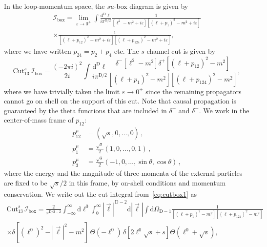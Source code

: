 \documentclass[12pt]{article}
\numberwithin{figure}{section}
\def \be {\begin{equation}}
\def \ee {\end{equation}}
\def \D {\mathrm{D}}
\def \d {\mathrm{d}}
\def \eps {\varepsilon}
\def \I {\mathcal{I}}
\def \boxx {\mathrm{box}}
\def \Cut {\mathrm{Cut}}
\begin{document}
	In the loop-momentum space, the $su$-box diagram is given by
	\begin{multline}
        \I_\boxx = \lim_{\eps \to 0^+} \int \frac{\d^\D \ell}{i \pi^{\D/2}}
        \frac{1}{[\ell^2 - m^2 + i\varepsilon][\left(\ell+p_{1}\right)^2 - m^2 + i\varepsilon]}
        \\ \times 
        \frac{1}{[\left(\ell+p_{12}\right)^2 - m^2 + i\varepsilon][\left(\ell+p_{124}\right)^2 - m^2 + i\varepsilon]}
        ,
        \label{eq:momboxintegral}
    \end{multline}
    where we have written $p_{24} = p_2 + p_4$ etc. The $s$-channel cut is given by
    \be
        \Cut_{13}^s \, \I_\boxx = \frac{(-2 \pi i )^2}{2 i} \int \frac{\d^\D \ell}{i \pi^{\D/2}}
        \frac{\delta^-\! \left[ \ell^2 - m^2 \right]
        \delta^+\!\left[ \left(\ell+p_{12}\right)^2 - m^2 \right]}{[\left(\ell+p_{1}\right)^2 - m^2][\left(\ell+p_{124}\right)^2 - m^2]}
        ,
        \label{eq:cutbox1}
    \ee
    where we have trivially taken the limit $\varepsilon \to 0^+$ since the remaining propagators cannot go on shell on the support of this cut. Note that causal propagation is guaranteed by the theta functions that are included in $\delta^+$ and $\delta^-$. We work in the center-of-mass frame of $p_{12}$:
    \begin{align} 
        p_{12}^\mu & = \left(\sqrt{s},0,\ldots,0\right) \,,
        \label{eq:box_coordinates_p12}
        \\
        p_1^\mu & = \tfrac{\sqrt{s}}{2} \left(1,0,\ldots,0,1 \right) \,,
        \label{eq:box_coordinates_p1}
        \\
        p_3^\mu & =  \tfrac{\sqrt{s}}{2} \left(-1,0,\ldots,\sin \theta ,\cos \theta \right) \,,
        \label{eq:box_coordinates}
    \end{align} 
    where the energy and the magnitude of three-momenta of the external particles are fixed to be $\sqrt{s}/2$ in this frame, by on-shell conditions and momentum conservation. We write out the cut integral from~\eqref{eq:cutbox1} as
    \begin{multline}
        \Cut_{13}^s \, \I_\boxx = \frac{2}{\pi^{\D/2-2}} \int_{-\infty}^{\infty} \!\d \ell^0\!\! \int_0^\infty |\vec{\ell}|^{\D-2} \d |\vec{\ell}| \int \d \Omega_{\D-1} \frac{1}{[\left(\ell+p_{1}\right)^2 - m^2][\left(\ell+p_{124}\right)^2 - m^2]}
        \\
        \times 
        \delta [(\ell^0)^2-|\vec{\ell}|^2-m^2 ]\, \Theta(-\ell^0)
        \,\delta \left[2 \ell^0 \sqrt{s} + s \right] \Theta(\ell^0+\sqrt{s})
        ,
    \end{multline}
\end{document}
